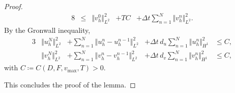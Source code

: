 \documentclass[11pt, a4paper]{amsart}
\numberwithin{equation}{section}
\begin{document}
\begin{proof}
\begin{alignat*}{8}
			&{}\leq {}  &\Vert v_h^{0}\Vert_{L^2}^2 &+ T C &+ \Delta t\sum_{n = 1}^{N}\Vert v_h^{n}\Vert_{L^2}^2.
		\end{alignat*}
		By the Gronwall inequality,
		\begin{alignat*}{3}
			&\Vert u_h^{N}\Vert_{L^2}^2 &+ \sum_{n = 1}^{N}\Vert u_h^{n} - u_h^{n-1}\Vert_{L^2}^2 &+ \Delta t\, d_u\sum_{n = 1}^{N}\Vert u_h^{n}\Vert_{H^1}^2 &{}\leq   C,
			\\
			&\Vert v_h^{N}\Vert_{L^2}^2 &+ \sum_{n = 1}^{N}\Vert v_h^{n} - v_h^{n-1}\Vert_{L^2}^2 & + \Delta t\, d_v\sum_{n = 1}^{N}\Vert v_h^{n}\Vert_{H^1}^2 &{}\leq   C,
		\end{alignat*}
		with $C\coloneqq C(D, F, v_{\mathrm{max}}, T)>0$.
		
		This concludes the proof of the lemma.
	\end{proof}
	
\end{document}
